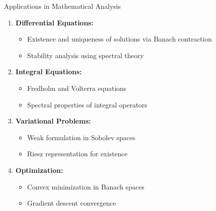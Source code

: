 \documentclass[aspectratio=169,10pt]{beamer}
\begin{document}
\begin{frame}{Applications in Mathematical Analysis}
  \begin{enumerate}
    \item \textbf{Differential Equations:}
      \begin{itemize}
        \item Existence and uniqueness of solutions via Banach contraction
        \item Stability analysis using spectral theory
      \end{itemize}

    \item \textbf{Integral Equations:}
      \begin{itemize}
        \item Fredholm and Volterra equations
        \item Spectral properties of integral operators
      \end{itemize}

    \item \textbf{Variational Problems:}
      \begin{itemize}
        \item Weak formulation in Sobolev spaces
        \item Riesz representation for existence
      \end{itemize}

    \item \textbf{Optimization:}
      \begin{itemize}
        \item Convex minimization in Banach spaces
        \item Gradient descent convergence
      \end{itemize}
  \end{enumerate}
\end{frame}
\end{document}

